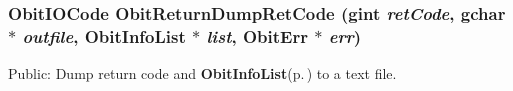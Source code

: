 \subsubsection{\setlength{\rightskip}{0pt plus 5cm}Obit\-IOCode Obit\-Return\-Dump\-Ret\-Code (gint {\em ret\-Code}, gchar $\ast$ {\em outfile}, {\bf Obit\-Info\-List} $\ast$ {\em list}, {\bf Obit\-Err} $\ast$ {\em err})}\label{ObitReturn_8h_a0}


Public: Dump return code and {\bf Obit\-Info\-List}{\rm (p.\,\pageref{structObitInfoList})} to a text file. 

